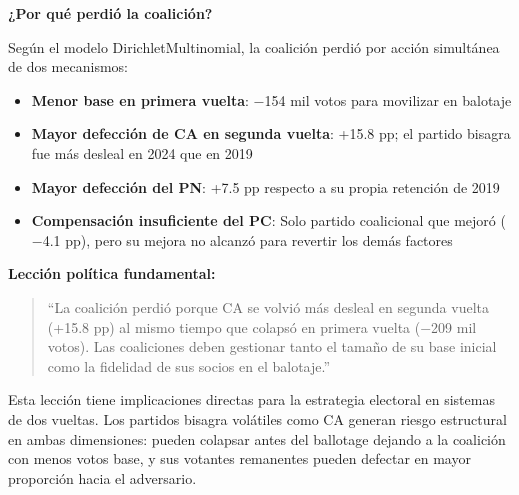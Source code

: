 \textbf{¿Por qué perdió la coalición?}

Según el modelo DirichletMultinomial, la coalición perdió por acción simultánea de dos mecanismos:

\begin{itemize}
    \item \textbf{Menor base en primera vuelta}: $-$154 mil votos para movilizar en balotaje
    \item \textbf{Mayor defección de CA en segunda vuelta}: +15.8 pp; el partido bisagra fue más desleal en 2024 que en 2019
    \item \textbf{Mayor defección del PN}: +7.5 pp respecto a su propia retención de 2019
    \item \textbf{Compensación insuficiente del PC}: Solo partido coalicional que mejoró ($-$4.1 pp), pero su mejora no alcanzó para revertir los demás factores
\end{itemize}

\textbf{Lección política fundamental:}

\begin{quote}
``La coalición perdió porque CA se volvió más desleal en segunda vuelta (+15.8 pp) al mismo tiempo que colapsó en primera vuelta ($-$209 mil votos). Las coaliciones deben gestionar tanto el tamaño de su base inicial como la fidelidad de sus socios en el balotaje.''
\end{quote}

Esta lección tiene implicaciones directas para la estrategia electoral en sistemas de dos vueltas. Los partidos bisagra volátiles como CA generan riesgo estructural en ambas dimensiones: pueden colapsar antes del ballotage dejando a la coalición con menos votos base, y sus votantes remanentes pueden defectar en mayor proporción hacia el adversario.
